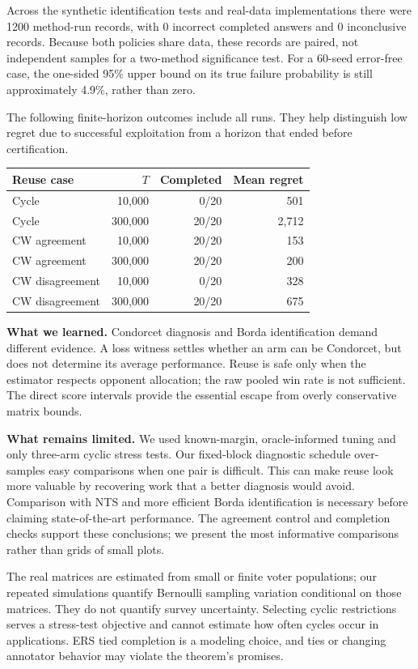 \documentclass[11pt,a4paper]{article}
\begin{document}
Across the synthetic identification tests and real-data implementations there were 1200 method-run records, with 0 incorrect completed answers and 0 inconclusive records. Because both policies share data, these records are paired, not independent samples for a two-method significance test. For a 60-seed error-free case, the one-sided 95\% upper bound on its true failure probability is still approximately 4.9\%, rather than zero.

The following finite-horizon outcomes include all runs. They help distinguish low regret due to successful exploitation from a horizon that ended before certification.
\begin{center}\begin{tabular}{lrrr}\toprule
Reuse case & $T$ & Completed & Mean regret\\\midrule
Cycle & 10,000 & 0/20 & 501 \\
Cycle & 300,000 & 20/20 & 2,712 \\
CW agreement & 10,000 & 20/20 & 153 \\
CW agreement & 300,000 & 20/20 & 200 \\
CW disagreement & 10,000 & 0/20 & 328 \\
CW disagreement & 300,000 & 20/20 & 675 \\
\bottomrule\end{tabular}\end{center}

\textbf{What we learned.} Condorcet diagnosis and Borda identification demand different evidence. A loss witness settles whether an arm can be Condorcet, but does not determine its average performance. Reuse is safe only when the estimator respects opponent allocation; the raw pooled win rate is not sufficient. The direct score intervals provide the essential escape from overly conservative matrix bounds.

\textbf{What remains limited.} We used known-margin, oracle-informed tuning and only three-arm cyclic stress tests. Our fixed-block diagnostic schedule over-samples easy comparisons when one pair is difficult. This can make reuse look more valuable by recovering work that a better diagnosis would avoid. Comparison with NTS and more efficient Borda identification is necessary before claiming state-of-the-art performance. The agreement control and completion checks support these conclusions; we present the most informative comparisons rather than grids of small plots.

The real matrices are estimated from small or finite voter populations; our repeated simulations quantify Bernoulli sampling variation conditional on those matrices. They do not quantify survey uncertainty. Selecting cyclic restrictions serves a stress-test objective and cannot estimate how often cycles occur in applications. ERS tied completion is a modeling choice, and ties or changing annotator behavior may violate the theorem's promises.
\end{document}
